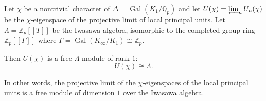 Let $\chi$ be a nontrivial character of $\Delta = \operatorname{Gal}(K_1/\mathbb{Q}_p)$ and let $U(\chi) = \varprojlim_n U_n(\chi)$ be the $\chi$-eigenspace of the projective limit of local principal units. Let $\Lambda = \mathbb{Z}_p[[T]]$ be the Iwasawa algebra, isomorphic to the completed group ring $\mathbb{Z}_p[[\Gamma]]$ where $\Gamma = \operatorname{Gal}(K_\infty/K_1) \cong \mathbb{Z}_p$.

Then $U(\chi)$ is a free $\Lambda$-module of rank $1$:
$$U(\chi) \cong \Lambda.$$

In other words, the projective limit of the $\chi$-eigenspaces of the local principal units is a free module of dimension $1$ over the Iwasawa algebra.
